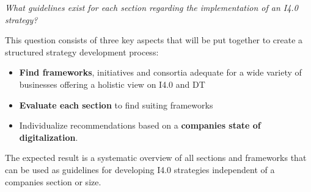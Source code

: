 \emph{What guidelines exist for each section regarding the implementation of an \acf{I4.0} strategy?}


This question consists of three key aspects that will be put together to create a structured strategy development process:
\begin{itemize}
    \item \textbf{Find frameworks}, initiatives and consortia adequate for a wide variety of businesses offering a holistic view on \ac{I4.0} and \ac{DT}
    \item \textbf{Evaluate each section} to find suiting frameworks
    \item Individualize recommendations based on a \textbf{companies state of digitalization}.
\end{itemize}

The expected result is a systematic overview of all sections and frameworks that can be used as guidelines for developing \ac{I4.0} strategies independent of a companies section or size. 



